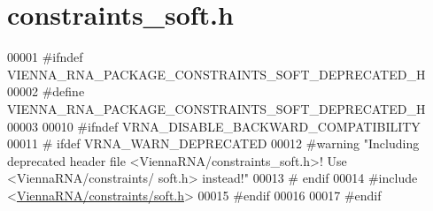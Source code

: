 \hypertarget{constraints__soft_8h_source}{}\section{constraints\+\_\+soft.\+h}
\label{constraints__soft_8h_source}

\begin{DoxyCode}
00001 \textcolor{preprocessor}{#ifndef VIENNA\_RNA\_PACKAGE\_CONSTRAINTS\_SOFT\_DEPRECATED\_H}
00002 \textcolor{preprocessor}{#define VIENNA\_RNA\_PACKAGE\_CONSTRAINTS\_SOFT\_DEPRECATED\_H}
00003 
00010 \textcolor{preprocessor}{#ifndef VRNA\_DISABLE\_BACKWARD\_COMPATIBILITY}
00011 \textcolor{preprocessor}{# ifdef VRNA\_WARN\_DEPRECATED}
00012 \textcolor{preprocessor}{#warning "Including deprecated header file <ViennaRNA/constraints\_soft.h>! Use <ViennaRNA/constraints/
      soft.h> instead!"}
00013 \textcolor{preprocessor}{# endif}
00014 \textcolor{preprocessor}{#include <\hyperlink{soft_8h}{ViennaRNA/constraints/soft.h}>}
00015 \textcolor{preprocessor}{#endif}
00016 
00017 \textcolor{preprocessor}{#endif}
\end{DoxyCode}

